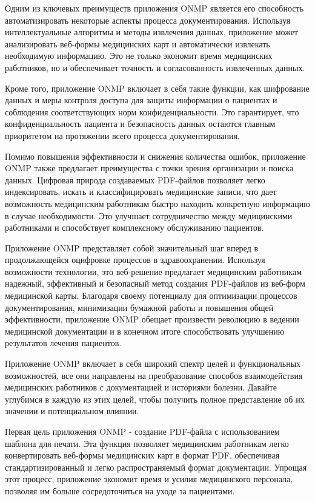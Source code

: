 Одним из ключевых преимуществ приложения ONMP является его способность автоматизировать некоторые аспекты процесса документирования. Используя интеллектуальные алгоритмы и методы извлечения данных, приложение может анализировать веб-формы медицинских карт и автоматически извлекать необходимую информацию. Это не только экономит время медицинских работников, но и обеспечивает точность и согласованность извлеченных данных.

Кроме того, приложение ONMP включает в себя такие функции, как шифрование данных и меры контроля доступа для защиты информации о пациентах и соблюдения соответствующих норм конфиденциальности. Это гарантирует, что конфиденциальность пациента и безопасность данных остаются главным приоритетом на протяжении всего процесса документирования.

Помимо повышения эффективности и снижения количества ошибок, приложение ONMP также предлагает преимущества с точки зрения организации и поиска данных. Цифровая природа создаваемых PDF-файлов позволяет легко индексировать, искать и классифицировать медицинские записи, что дает возможность медицинским работникам быстро находить конкретную информацию в случае необходимости. Это улучшает сотрудничество между медицинскими работниками и способствует комплексному обслуживанию пациентов.

Приложение ONMP представляет собой значительный шаг вперед в продолжающейся оцифровке процессов в здравоохранении. Используя возможности технологии, это веб-решение предлагает медицинским работникам надежный, эффективный и безопасный метод создания PDF-файлов из веб-форм медицинской карты. Благодаря своему потенциалу для оптимизации процессов документирования, минимизации бумажной работы и повышения общей эффективности, приложение ONMP обещает произвести революцию в ведении медицинской документации и в конечном итоге способствовать улучшению результатов лечения пациентов.

Приложение ONMP включает в себя широкий спектр целей и функциональных возможностей, все они направлены на преобразование способов взаимодействия медицинских работников с документацией и историями болезни. Давайте углубимся в каждую из этих целей, чтобы получить полное представление об их значении и потенциальном влиянии.

Первая цель приложения ONMP - создание PDF-файла с использованием шаблона для печати. Эта функция позволяет медицинским работникам легко конвертировать веб-формы медицинских карт в формат PDF, обеспечивая стандартизированный и легко распространяемый формат документации. Упрощая этот процесс, приложение экономит время и усилия медицинского персонала, позволяя им больше сосредоточиться на уходе за пациентами.

